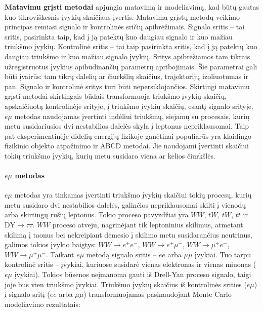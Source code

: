 \documentclass[a4paper, 12pt, oneside]{article}
\newcommand{\tbarW}{\bar{t}W}
\newcommand{\ttbar}{t\bar{t}}
\newcommand{\emu}{e\mu}
\newcommand{\DYtau}{\mathrm{DY} \! \rightarrow \! \tau\tau}
\begin{document}
\textbf{Matavimu grįsti metodai} apjungia matavimą ir modeliavimą, kad būtų gautas kuo tikroviškesnis įvykių skaičiaus įvertis.
Matavimu grįstų metodų veikimo principas remiasi signalo ir kontrolinės sričių apibrėžimais.
Signalo sritis -- tai sritis, pasirinkta taip, kad į ją patektų kuo daugiau signalo ir kuo mažiau triukšmo įvykių.
Kontrolinė sritis -- tai taip pasirinkta sritis, kad į ją patektų kuo daugiau triukšmo ir kuo mažiau signalo įvykių.
Sritys apibrėžiamos tam tikrais užregistruotus įvykius apibūdinančių parametrų apribojimais.
Šie parametrai gali būti įvairūs: tam tikrų dalelių ar čiurkšlių skaičius, trajektorijų izoliuotumas ir pan.
Signalo ir kontrolinė sritys turi būti nepersiklojančios.
Skirtingi matavimu grįsti metodai skirtingais būdais transformuoja triukšmo įvykių skaičių, apskaičiuotą kontrolinėje
srityje, į triukšmo įvykių skaičių, esantį signalo srityje.
$\emu$ metodas naudojamas įvertinti indėliui triukšmų, siejamų su procesais, kurių metu susidariusios dvi nestabilios dalelės
skyla į leptonus nepriklausomai.
Taip pat eksperimentinėje didelių energijų fizikoje ganėtinai populiarūs yra klaidingo fizikinio objekto atpažinimo ir ABCD metodai.
Jie naudojami įvertinti skaičiui tokių triukšmo įvykių, kurių metu susidaro viena ar kelios čiurkšlės.

\paragraph{$\emu$ metodas\\}

$\emu$ metodas yra tinkamas įvertinti triukšmo įvykių skaičiui tokių procesų, kurių metu susidaro dvi
nestabilios dalelės, galinčios nepriklausomai skilti į vienodų arba skirtingų rūšių leptonus.
Tokio proceso pavyzdžiai yra $WW$, $tW$, $\tbarW$, $\ttbar$ ir $\DYtau$.
$WW$ proceso atveju, nagrinėjant tik leptoninius skilimus, atmetant skilimą į taonus bei nekreipiant dėmesio į skilimo metu
susidarančius neutrinus, galimos tokios įvykio baigtys: $WW\rightarrow e^{+} e^{-}$, $WW\rightarrow e^{+}\mu^{-}$,
$WW\rightarrow \mu^{+}e^{-}$, $WW\rightarrow \mu^{+}\mu^{-}$.
Taikant $\emu$ metodą signalo sritis -- $ee$ arba $\mu\mu$ įvykiai.
Tuo tarpu kontrolinė sritis -- įvykiai, kuriuose susidarė vienas elektronas ir vienas miuonas ($\emu$ įvykiai).
Tokios būsenos neįmanoma gauti iš Drell-Yan proceso signalo, taigi joje bus vien triukšmo įvykiai.
Triukšmo įvykių skaičius iš kontrolinės srities ($\emu$) į signalo sritį ($ee$ arba $\mu\mu$)
transformuojamas pasinaudojant Monte Carlo modeliavimo rezultatais:
\end{document}
